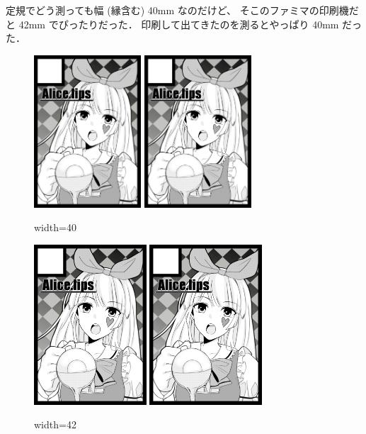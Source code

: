\documentclass[a4paper]{jarticle}
\begin{document}
定規でどう測っても幅 (縁含む) 40mm なのだけど、
そこのファミマの印刷機だと 42mm でぴったりだった．
印刷して出てきたのを測るとやっぱり 40mm だった．

\begin{figure}
  \includegraphics[width=40mm,bb=0 0 600 853]{AliceLips.png}
  \hfill
  \includegraphics[width=40mm,bb=0 0 600 853]{AliceLips.png}
  \caption{width=40}
\end{figure}

\begin{figure}
  \includegraphics[width=42mm,bb=0 0 600 853]{AliceLips.png}
  \hfill
  \includegraphics[width=42mm,bb=0 0 600 853]{AliceLips.png}
  \caption{width=42}
\end{figure}
\end{document}
